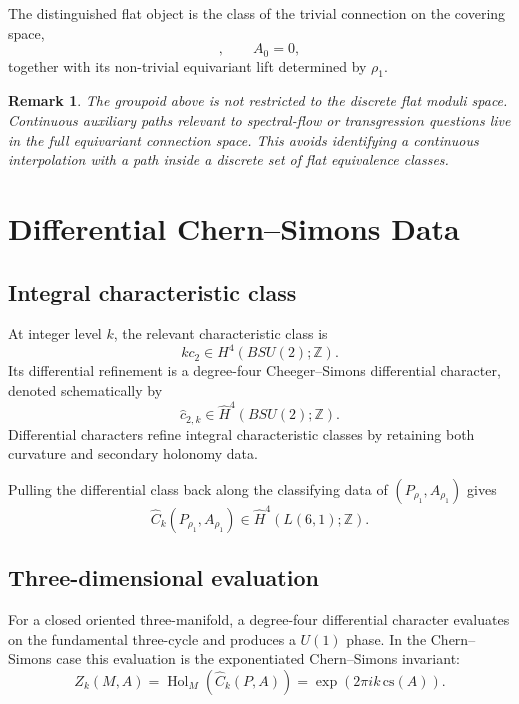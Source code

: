 \documentclass[11pt,a4paper]{article}
\newtheorem{remark}[definition]{Remark}
\begin{document}
The distinguished flat object is the class of the trivial connection on the covering space,
\begin{equation}
[A_0],
\qquad
A_0=0,
\end{equation}
together with its non-trivial equivariant lift determined by $\rho_1$.

\begin{remark}
The groupoid above is not restricted to the discrete flat moduli space. Continuous auxiliary paths relevant to spectral-flow or transgression questions live in the full equivariant connection space. This avoids identifying a continuous interpolation with a path inside a discrete set of flat equivalence classes.
\end{remark}

\section{Differential Chern--Simons Data}

\subsection{Integral characteristic class}

At integer level $k$, the relevant characteristic class is
\begin{equation}
kc_2\in H^4(BSU(2);\mathbb Z).
\end{equation}
Its differential refinement is a degree-four Cheeger--Simons differential character, denoted schematically by
\begin{equation}
\widehat c_{2,k}\in\widehat H^4(BSU(2);\mathbb Z).
\end{equation}
Differential characters refine integral characteristic classes by retaining both curvature and secondary holonomy data\cite{CheegerSimons1985}.

Pulling the differential class back along the classifying data of $(P_{\rho_1},A_{\rho_1})$ gives
\begin{equation}
\widehat C_k(P_{\rho_1},A_{\rho_1})
\in
\widehat H^4(L(6,1);\mathbb Z).
\end{equation}

\subsection{Three-dimensional evaluation}

For a closed oriented three-manifold, a degree-four differential character evaluates on the fundamental three-cycle and produces a $U(1)$ phase. In the Chern--Simons case this evaluation is the exponentiated Chern--Simons invariant\cite{Freed1995,CheegerSimons1985}:
\begin{equation}
\boxed{
Z_k(M,A)
=
\operatorname{Hol}_{M}\left(\widehat C_k(P,A)\right)
=
\exp\left(2\pi i k\,\mathrm{cs}(A)\right).
}
\end{equation}
\end{document}
